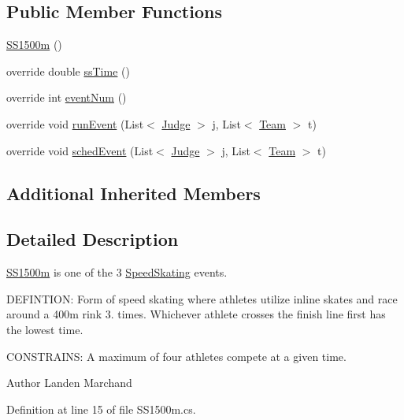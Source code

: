 \subsection*{Public Member Functions}
\begin{DoxyCompactItemize}
\item 
\hyperlink{classPCO_1_1SS1500m_abcd0ba6477a4d91d5d39031b0fb60d9e}{S\+S1500m} ()
\item 
override double \hyperlink{classPCO_1_1SS1500m_acd55a4c8b05bfe2acfebe0bb9bf58d26}{ss\+Time} ()
\item 
override int \hyperlink{classPCO_1_1SS1500m_ab027d041adf7b8dea0b3189948ceb5d1}{event\+Num} ()
\item 
override void \hyperlink{classPCO_1_1SS1500m_a2e52ec9781aedcfdf1a47d8a8f4560ff}{run\+Event} (List$<$ \hyperlink{classPCO_1_1Judge}{Judge} $>$ j, List$<$ \hyperlink{classPCO_1_1Team}{Team} $>$ t)
\item 
override void \hyperlink{classPCO_1_1SS1500m_aebbf1e9bd3d845f68339381daf22ef23}{sched\+Event} (List$<$ \hyperlink{classPCO_1_1Judge}{Judge} $>$ j, List$<$ \hyperlink{classPCO_1_1Team}{Team} $>$ t)
\end{DoxyCompactItemize}
\subsection*{Additional Inherited Members}


\subsection{Detailed Description}
\hyperlink{classPCO_1_1SS1500m}{S\+S1500m} is one of the 3 \hyperlink{classPCO_1_1SpeedSkating}{Speed\+Skating} events. 

D\+E\+F\+I\+N\+T\+I\+O\+N\+: Form of speed skating where athletes utilize inline skates and race around a 400m rink 3. times. Whichever athlete crosses the finish line first has the lowest time.

C\+O\+N\+S\+T\+R\+A\+I\+N\+S\+: A maximum of four athletes compete at a given time.\begin{DoxyAuthor}{Author}
Landen Marchand 
\end{DoxyAuthor}


Definition at line 15 of file S\+S1500m.\+cs.



